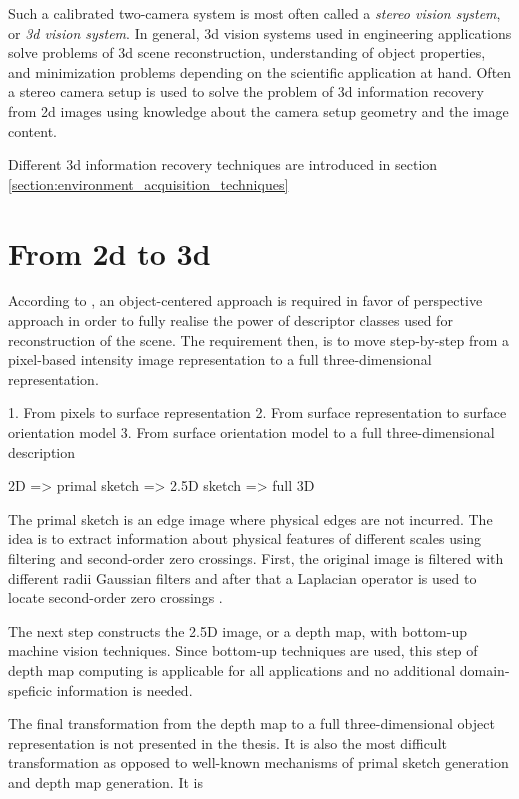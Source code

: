 \documentclass[12pt,a4paper,oneside,pdftex]{report}
\begin{document}
{Such a calibrated two-camera system is most often called a \emph{stereo vision system}, or \emph{3d vision system}. In general, 3d vision systems used in engineering applications solve problems of 3d scene reconstruction, understanding of object properties, and minimization problems depending on the scientific application at hand. Often a stereo camera setup is used to solve the problem of 3d information recovery from 2d images using knowledge about the camera setup geometry and the image content.\cite{Sonka07}

Different 3d information recovery techniques are introduced in section \ref{section:environment_acquisition_techniques} 

\section{From 2d to 3d}
\label{section:from_2d_to_3d}

According to \cite{Sonka07}, an object-centered approach is required in favor of perspective approach in order to fully realise the power of descriptor classes used for reconstruction of the scene. The requirement then, is to move step-by-step from a pixel-based intensity image representation to a full three-dimensional representation.

1. From pixels to surface representation
2. From surface representation to surface orientation model
3. From surface orientation model to a full three-dimensional description

2D => primal sketch => 2.5D sketch => full 3D

The primal sketch is an edge image where physical edges are not incurred. The idea is to extract information about physical features of different scales using filtering and second-order zero crossings. First, the original image is filtered with different radii Gaussian filters and after that a Laplacian operator is used to locate second-order zero crossings \cite{Sonka07}. 

The next step constructs the 2.5D image, or a depth map, with bottom-up machine vision techniques. Since bottom-up techniques are used, this step of depth map computing is applicable for all applications and no additional domain-speficic information is needed. 

The final transformation from the depth map to a full three-dimensional object representation is not presented in the thesis. It is also the most difficult transformation as opposed to well-known mechanisms of primal sketch generation and depth map generation. It is 


}
\end{document}
